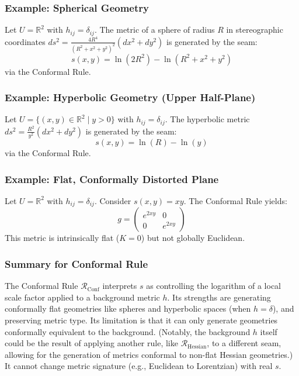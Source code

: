 \documentclass[twoside,twocolumn]{article}
\begin{document}
\subsubsection{Example: Spherical Geometry}
Let $U = \mathbb{R}^2$ with $h_{ij} = \delta_{ij}$. The metric of a sphere of radius $R$ in stereographic coordinates $ds^2 = \frac{4R^4}{(R^2 + x^2 + y^2)^2}(dx^2 + dy^2)$ is generated by the seam:
$$ s(x, y) = \ln(2R^2) - \ln(R^2 + x^2 + y^2) $$
via the Conformal Rule.

\subsubsection{Example: Hyperbolic Geometry (Upper Half-Plane)}
Let $U = \{ (x, y) \in \mathbb{R}^2 \mid y > 0 \}$ with $h_{ij} = \delta_{ij}$. The hyperbolic metric $ds^2 = \frac{R^2}{y^2} (dx^2 + dy^2)$ is generated by the seam:
$$ s(x, y) = \ln(R) - \ln(y) $$
via the Conformal Rule.

\subsubsection{Example: Flat, Conformally Distorted Plane}
Let $U = \mathbb{R}^2$ with $h_{ij} = \delta_{ij}$. Consider $s(x, y) = xy$. The Conformal Rule yields:
$$ g = \begin{pmatrix} e^{2xy} & 0 \\ 0 & e^{2xy} \end{pmatrix} $$
This metric is intrinsically flat ($K=0$) but not globally Euclidean.

\subsubsection{Summary for Conformal Rule}
The Conformal Rule $\mathcal{R}_{\text{Conf}}$ interprets $s$ as controlling the logarithm of a local scale factor applied to a background metric $h$. Its strengths are generating conformally flat geometries like spheres and hyperbolic spaces (when $h=\delta$), and preserving metric type. Its limitation is that it can only generate geometries conformally equivalent to the background. (Notably, the background $h$ itself could be the result of applying another rule, like $\mathcal{R}_{\text{Hessian}}$, to a different seam, allowing for the generation of metrics conformal to non-flat Hessian geometries.) It cannot change metric signature (e.g., Euclidean to Lorentzian) with real $s$.

\end{document}
